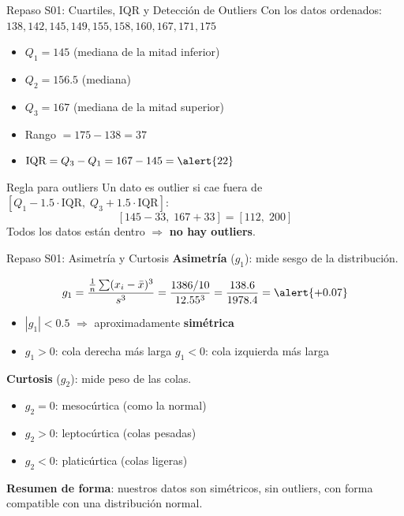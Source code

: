 \documentclass[aspectratio=169, 11pt]{beamer}
\begin{document}
\begin{frame}{Repaso S01: Cuartiles, IQR y Detecci\'on de Outliers}
Con los datos ordenados: $138, 142, 145, 149, 155, 158, 160, 167, 171, 175$

\begin{itemize}
  \item $Q_1 = 145$ \quad (mediana de la mitad inferior)
  \item $Q_2 = 156.5$ \quad (mediana)
  \item $Q_3 = 167$ \quad (mediana de la mitad superior)
  \item Rango $= 175 - 138 = 37$
  \item $\text{IQR} = Q_3 - Q_1 = 167 - 145 = \alert{22}$
\end{itemize}

\vspace{0.3cm}
\begin{block}{Regla para outliers}
Un dato es outlier si cae fuera de $[Q_1 - 1.5\cdot\text{IQR},\; Q_3 + 1.5\cdot\text{IQR}]$:
\[
[145 - 33,\; 167 + 33] = [112,\; 200]
\]
Todos los datos est\'an dentro $\Rightarrow$ \textbf{no hay outliers}.
\end{block}
\end{frame}

\begin{frame}{Repaso S01: Asimetr\'ia y Curtosis}
\textbf{Asimetr\'ia} ($g_1$): mide sesgo de la distribuci\'on.

\[
g_1 = \frac{\frac{1}{n}\sum(x_i - \bar{x})^3}{s^3} = \frac{1386/10}{12.55^3} = \frac{138.6}{1978.4} = \alert{+0.07}
\]

\begin{itemize}
  \item $|g_1| < 0.5$ $\Rightarrow$ aproximadamente \textbf{sim\'etrica}
  \item $g_1 > 0$: cola derecha m\'as larga \quad $g_1 < 0$: cola izquierda m\'as larga
\end{itemize}

\vspace{0.3cm}
\textbf{Curtosis} ($g_2$): mide peso de las colas.
\begin{itemize}
  \item $g_2 = 0$: mesoc\'urtica (como la normal)
  \item $g_2 > 0$: leptoc\'urtica (colas pesadas)
  \item $g_2 < 0$: platic\'urtica (colas ligeras)
\end{itemize}

\vspace{0.3cm}
\small\textbf{Resumen de forma}: nuestros datos son sim\'etricos, sin outliers, con forma compatible con una distribuci\'on normal.
\end{frame}
\end{document}
